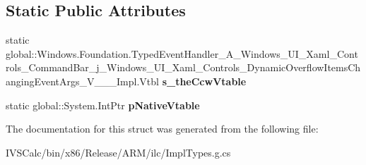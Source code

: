 \subsection*{Static Public Attributes}
\begin{DoxyCompactItemize}
\item 
\mbox{\label{struct_windows_1_1_foundation_1_1_typed_event_handler___a___windows___u_i___xaml___controls___co63bd2e5cd00e6ef40624678b07024809_a6be43cf48280a9eff7d3d8d9abe86a36}} 
static global\+::\+Windows.\+Foundation.\+Typed\+Event\+Handler\+\_\+\+A\+\_\+\+Windows\+\_\+\+U\+I\+\_\+\+Xaml\+\_\+\+Controls\+\_\+\+Command\+Bar\+\_\+j\+\_\+\+Windows\+\_\+\+U\+I\+\_\+\+Xaml\+\_\+\+Controls\+\_\+\+Dynamic\+Overflow\+Items\+Changing\+Event\+Args\+\_\+\+V\+\_\+\+\_\+\+\_\+\+Impl.\+Vtbl {\bfseries s\+\_\+the\+Ccw\+Vtable}
\item 
\mbox{\label{struct_windows_1_1_foundation_1_1_typed_event_handler___a___windows___u_i___xaml___controls___co63bd2e5cd00e6ef40624678b07024809_a0f5f7d8dee80ca83166cb4743fea51d4}} 
static global\+::\+System.\+Int\+Ptr {\bfseries p\+Native\+Vtable}
\end{DoxyCompactItemize}


The documentation for this struct was generated from the following file\+:\begin{DoxyCompactItemize}
\item 
I\+V\+S\+Calc/bin/x86/\+Release/\+A\+R\+M/ilc/Impl\+Types.\+g.\+cs\end{DoxyCompactItemize}
